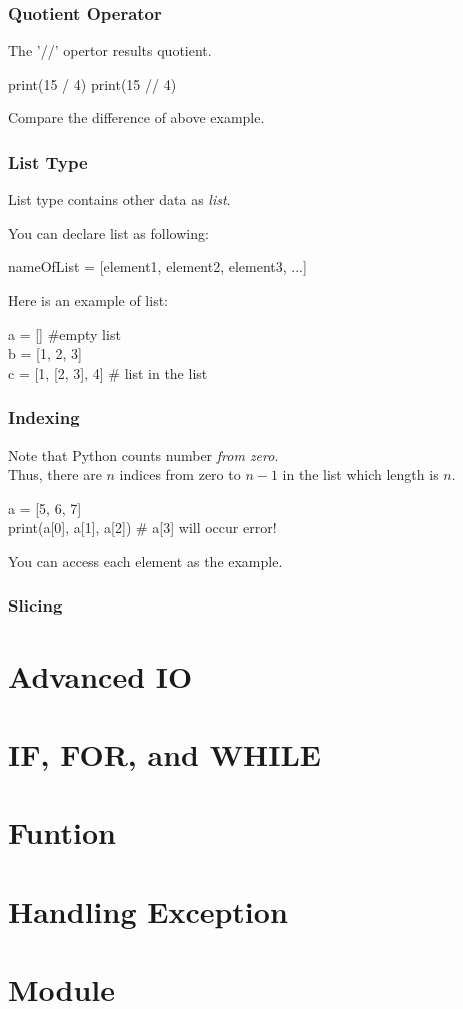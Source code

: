 \documentclass{beamer}
\begin{document}
	\begin{frame}
		\frametitle{Quotient Operator}
		The '//' opertor results quotient.
		
		\begin{example}
			print(15 / 4)
			print(15 // 4)
		\end{example}
	
		Compare the difference of above example. 
	\end{frame}

	\begin{frame}
		\frametitle{List Type}
		
		List type contains other data as \textit{list}.
		
		You can declare list as following:
		\begin{example}
			nameOfList = [element1, element2, element3, ...]
		\end{example}
	
		Here is an example of list:
		\begin{example}
			a = [] \#empty list \\
			b = [1, 2, 3] \\
			c = [1, [2, 3], 4] \# list in the list
		\end{example}
	\end{frame}

	\begin{frame}
		\frametitle{Indexing}
		Note that Python counts number \textit{from zero}. \\
		Thus, there are $n$ indices from zero to $n-1$ in the list which length is $n$.
		
		\begin{example}
			a = [5, 6, 7] \\
			print(a[0], a[1], a[2]) \# a[3] will occur error!
		\end{example}
	
		You can access each element as the example. 
	\end{frame}

	\begin{frame}
		\frametitle{Slicing}
		
	\end{frame}

	\section{Advanced IO}
	
	\section{IF, FOR, and WHILE}

	\section{Funtion}
	
	\section{Handling Exception}
	
	\section{Module}
\end{document}
